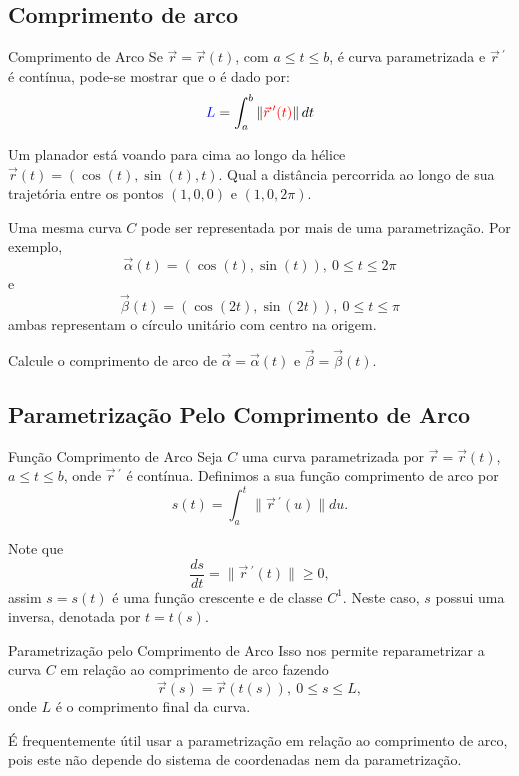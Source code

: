 \subsection*{Comprimento de arco}


\begin{frame}[label=fun-vet]{Comprimento de Arco}
	 Se {\color{red}$\vec{r}=\vec{r}(t)$}, com $a\leq t\leq b$, é curva parametrizada e {\color{red}$\vec{r}\,^\prime$ } é contínua, pode-se mostrar que o  é dado por:
	\[\textcolor{blue}{L}=\int_a^b\|{\color{red}\vec{r}\,'(t)}\|\,dt\]
	\begin{exe}
		Um planador está voando para cima ao longo da hélice $\vec{r}(t)=(\cos(t),\sin(t),t)$. Qual a distância percorrida ao longo de sua trajetória entre os pontos $(1,0,0)$ e $(1,0,2\pi)$.
	\end{exe}
 \end{frame}


\begin{frame}
Uma mesma curva $C$ pode ser representada por mais de uma parametrização. Por exemplo, 
\[\vec{\alpha}(t)=(\cos(t),\sin(t)),\ 0\leq t\leq 2\pi\]
e
\[\vec{\beta}(t)=(\cos(2t),\sin(2t)),\ 0\leq t\leq \pi\]
ambas representam o círculo unitário com centro na origem. 

\begin{exer}
Calcule o comprimento de arco de $\vec{\alpha}=\vec{\alpha}(t)$ e $\vec{\beta}=\vec{\beta}(t)$.
\end{exer}
\end{frame}


\subsection*{Parametrização Pelo Comprimento de Arco}
\begin{frame}[label=fun-vet]{Função Comprimento de Arco}
Seja $C$ uma curva parametrizada por $\vec{r}=\vec{r}(t)$, $a\leq t\leq b$, onde $\vec{r}\,^\prime$ é contínua. Definimos a sua {\color{blue} função comprimento de arco} por
\[s(t)=\int_a^t\|\vec{r}\,^\prime (u)\|du.\]

Note que 
\[\frac{ds}{dt}=\|\vec{r}\,^\prime (t)\|\geq 0,\]
assim $s=s(t)$ é uma {\color{red}função crescente} e de classe $C^1$. Neste caso, $s$ possui uma inversa, denotada por $t=t(s)$.

\end{frame}


\begin{frame}[label=fun-vet]{Parametrização pelo Comprimento de Arco}
Isso nos permite {\color{red} reparametrizar a curva $C$ em relação ao comprimento de arco} fazendo
\[\vec{r}(s)=\vec{r}(t(s)),\ 0\leq s\leq L,\]
onde $L$ é o comprimento final da curva.

\begin{block}{ }
É frequentemente útil usar a parametrização em relação ao comprimento de arco, pois este não depende do sistema de coordenadas nem da parametrização.
\end{block}
\end{frame}

